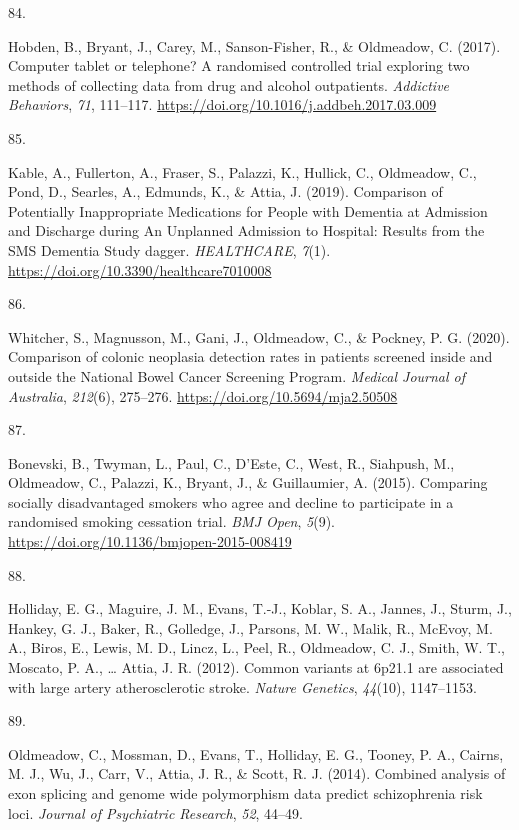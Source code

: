 \documentclass[11pt, a4paper]{awesome-cv}
\newlength{\csllabelwidth}
\newcommand{\CSLLeftMargin}[1]{\parbox[t]{\csllabelwidth}{#1}}
\newcommand{\CSLRightInline}[1]{\parbox[t]{\linewidth - \csllabelwidth}{#1}}
\begin{document}
\leavevmode\hypertarget{ref-hobden_computer_2017}{}%
\CSLLeftMargin{84. }
\CSLRightInline{Hobden, B., Bryant, J., Carey, M., Sanson-Fisher, R., \&
Oldmeadow, C. (2017). Computer tablet or telephone? A randomised
controlled trial exploring two methods of collecting data from drug and
alcohol outpatients. \emph{Addictive Behaviors}, \emph{71}, 111--117.
\url{https://doi.org/10.1016/j.addbeh.2017.03.009}}

\leavevmode\hypertarget{ref-kable_comparison_2019}{}%
\CSLLeftMargin{85. }
\CSLRightInline{Kable, A., Fullerton, A., Fraser, S., Palazzi, K.,
Hullick, C., Oldmeadow, C., Pond, D., Searles, A., Edmunds, K., \&
Attia, J. (2019). Comparison of Potentially Inappropriate Medications
for People with Dementia at Admission and Discharge during An Unplanned
Admission to Hospital: Results from the SMS Dementia Study dagger.
\emph{HEALTHCARE}, \emph{7}(1).
\url{https://doi.org/10.3390/healthcare7010008}}

\leavevmode\hypertarget{ref-whitcher_comparison_2020}{}%
\CSLLeftMargin{86. }
\CSLRightInline{Whitcher, S., Magnusson, M., Gani, J., Oldmeadow, C., \&
Pockney, P. G. (2020). Comparison of colonic neoplasia detection rates
in patients screened inside and outside the National Bowel Cancer
Screening Program. \emph{Medical Journal of Australia}, \emph{212}(6),
275--276. \url{https://doi.org/10.5694/mja2.50508}}

\leavevmode\hypertarget{ref-bonevski_comparing_2015}{}%
\CSLLeftMargin{87. }
\CSLRightInline{Bonevski, B., Twyman, L., Paul, C., D'Este, C., West,
R., Siahpush, M., Oldmeadow, C., Palazzi, K., Bryant, J., \&
Guillaumier, A. (2015). Comparing socially disadvantaged smokers who
agree and decline to participate in a randomised smoking cessation
trial. \emph{BMJ Open}, \emph{5}(9).
\url{https://doi.org/10.1136/bmjopen-2015-008419}}

\leavevmode\hypertarget{ref-holliday_common_2012}{}%
\CSLLeftMargin{88. }
\CSLRightInline{Holliday, E. G., Maguire, J. M., Evans, T.-J., Koblar,
S. A., Jannes, J., Sturm, J., Hankey, G. J., Baker, R., Golledge, J.,
Parsons, M. W., Malik, R., McEvoy, M. A., Biros, E., Lewis, M. D.,
Lincz, L., Peel, R., Oldmeadow, C. J., Smith, W. T., Moscato, P. A.,
\ldots{} Attia, J. R. (2012). Common variants at 6p21.1 are associated
with large artery atherosclerotic stroke. \emph{Nature Genetics},
\emph{44}(10), 1147--1153.}

\leavevmode\hypertarget{ref-oldmeadow_combined_2014}{}%
\CSLLeftMargin{89. }
\CSLRightInline{Oldmeadow, C., Mossman, D., Evans, T., Holliday, E. G.,
Tooney, P. A., Cairns, M. J., Wu, J., Carr, V., Attia, J. R., \& Scott,
R. J. (2014). Combined analysis of exon splicing and genome wide
polymorphism data predict schizophrenia risk loci. \emph{Journal of
Psychiatric Research}, \emph{52}, 44--49.}
\end{document}
